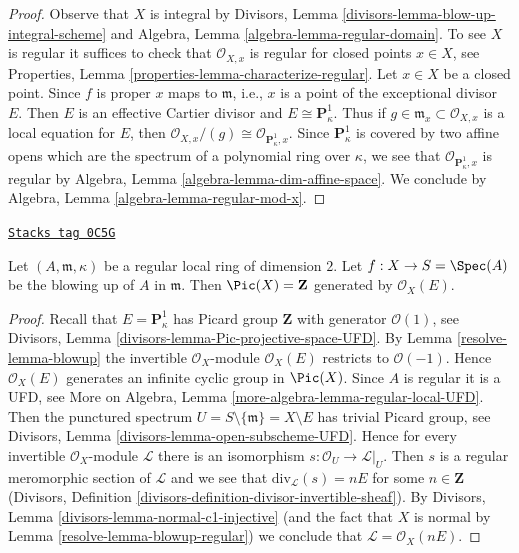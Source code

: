 \begin{proof}
Observe that $X$ is integral by
Divisors, Lemma \ref{divisors-lemma-blow-up-integral-scheme}
and
Algebra, Lemma \ref{algebra-lemma-regular-domain}.
To see $X$ is regular it suffices to check that $\mathcal{O}_{X, x}$
is regular for closed points $x \in X$, see
Properties, Lemma \ref{properties-lemma-characterize-regular}.
Let $x \in X$ be a closed point. Since $f$ is proper $x$ maps to
$\mathfrak m$, i.e., $x$ is a point of the exceptional divisor $E$.
Then $E$ is an effective Cartier divisor and $E \cong \mathbf{P}^1_\kappa$.
Thus if $g \in \mathfrak m_x \subset \mathcal{O}_{X, x}$ is a local
equation for $E$, then
$\mathcal{O}_{X, x}/(g) \cong \mathcal{O}_{\mathbf{P}^1_\kappa, x}$.
Since $\mathbf{P}^1_\kappa$ is covered by two affine opens which are the
spectrum of a polynomial ring over $\kappa$, we see that
$\mathcal{O}_{\mathbf{P}^1_\kappa, x}$ is regular by
Algebra, Lemma \ref{algebra-lemma-dim-affine-space}.
We conclude by
Algebra, Lemma \ref{algebra-lemma-regular-mod-x}.
\end{proof}

\begin{lemma}
\label{resolve-lemma-blowup-pic}
\href{https://stacks.math.columbia.edu/tag/0C5G}{\texttt{Stacks tag 0C5G}}

Let $(A, \mathfrak m, \kappa)$ be a regular local ring of dimension $2$.
Let $f : X \to S = \Spec(A)$ be the blowing up of $A$ in $\mathfrak m$.
Then $\Pic(X) = \mathbf{Z}$ generated by $\mathcal{O}_X(E)$.
\end{lemma}

\begin{proof}

Recall that $E = \mathbf{P}^1_\kappa$ has Picard group $\mathbf{Z}$
with generator $\mathcal{O}(1)$, see
Divisors, Lemma \ref{divisors-lemma-Pic-projective-space-UFD}.
By Lemma \ref{resolve-lemma-blowup} the invertible $\mathcal{O}_X$-module
$\mathcal{O}_X(E)$ restricts to $\mathcal{O}(-1)$. Hence
$\mathcal{O}_X(E)$ generates an infinite cyclic group in $\Pic(X)$.
Since $A$ is regular it is a UFD, see More on Algebra,
Lemma \ref{more-algebra-lemma-regular-local-UFD}.
Then the punctured spectrum $U = S \setminus \{\mathfrak m\} = X \setminus E$
has trivial Picard group, see
Divisors, Lemma \ref{divisors-lemma-open-subscheme-UFD}.
Hence for every invertible $\mathcal{O}_X$-module $\mathcal{L}$
there is an isomorphism $s : \mathcal{O}_U \to \mathcal{L}|_U$.
Then $s$ is a regular meromorphic section of $\mathcal{L}$
and we see that $\text{div}_\mathcal{L}(s) = nE$ for some
$n \in \mathbf{Z}$
(Divisors, Definition \ref{divisors-definition-divisor-invertible-sheaf}).
By Divisors, Lemma \ref{divisors-lemma-normal-c1-injective}
(and the fact that $X$ is normal by Lemma \ref{resolve-lemma-blowup-regular})
we conclude that $\mathcal{L} = \mathcal{O}_X(nE)$.
\end{proof}

